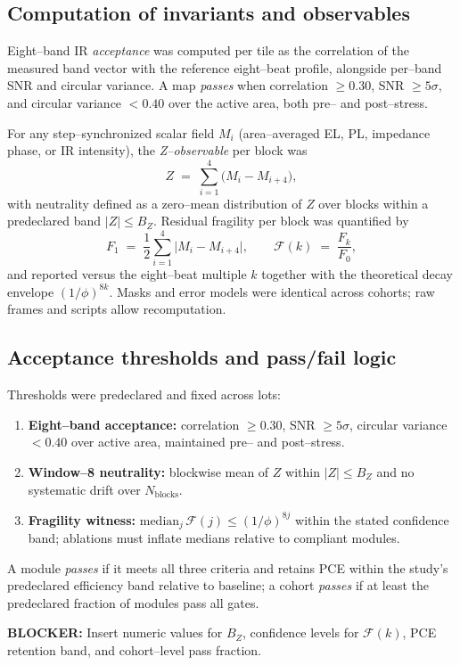 \documentclass[12pt]{article}
\begin{document}
\subsection*{Computation of invariants and observables}
Eight–band IR \emph{acceptance} was computed per tile as the correlation of the measured band vector with the reference eight–beat profile, alongside per–band SNR and circular variance. A map \emph{passes} when correlation $\ge 0.30$, SNR $\ge 5\sigma$, and circular variance $<0.40$ over the active area, both pre– and post–stress.
\par
For any step–synchronized scalar field $M_i$ (area–averaged EL, PL, impedance phase, or IR intensity), the \emph{Z–observable} per block was
\[
Z \;=\; \sum_{i=1}^{4}\big(M_i - M_{i+4}\big),
\]
with neutrality defined as a zero–mean distribution of $Z$ over blocks within a predeclared band $|Z|\le B_Z$. Residual fragility per block was quantified by
\[
F_1 \;=\; \frac{1}{2}\sum_{i=1}^{4}\big|M_i - M_{i+4}\big|,\qquad 
\mathcal{F}(k)\;=\;\frac{F_k}{F_0},
\]
and reported versus the eight–beat multiple $k$ together with the theoretical decay envelope $(1/\phi)^{8k}$. Masks and error models were identical across cohorts; raw frames and scripts allow recomputation.

\subsection*{Acceptance thresholds and pass/fail logic}
Thresholds were predeclared and fixed across lots:
\begin{enumerate}
  \item \textbf{Eight–band acceptance:} correlation $\ge 0.30$, SNR $\ge 5\sigma$, circular variance $<0.40$ over active area, maintained pre– and post–stress.
  \item \textbf{Window–8 neutrality:} blockwise mean of $Z$ within $|Z|\le B_Z$ and no systematic drift over $N_{\mathrm{blocks}}$.
  \item \textbf{Fragility witness:} $\mathrm{median}_j\,\mathcal{F}(j)\le (1/\phi)^{8j}$ within the stated confidence band; ablations must inflate medians relative to compliant modules.
\end{enumerate}
A module \emph{passes} if it meets all three criteria and retains PCE within the study’s predeclared efficiency band relative to baseline; a cohort \emph{passes} if at least the predeclared fraction of modules pass all gates.
\par\noindent\textbf{BLOCKER:} Insert numeric values for $B_Z$, confidence levels for $\mathcal{F}(k)$, PCE retention band, and cohort–level pass fraction.
\end{document}
